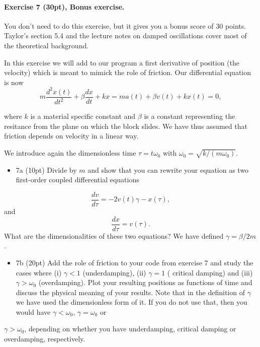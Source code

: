 \documentclass[%
oneside,                 %
final,                   %
10pt]{article}
\begin{document}
\paragraph{Exercise 7 (30pt), Bonus exercise.}
You don't need to do this exercise, but it gives you a bonus score of 30 points. Taylor's section 5.4 and the lecture notes on damped oscillations cover most of the theoretical background.

In this exercise we will add to our program a first derivative of position (the velocity) which is meant to mimick the role of friction.
Our differential equation is now
\[
m\frac{d^2x(t)}{dt^2}+\beta\frac{dx}{dt}+kx=ma(t)+\beta v(t)+kx(t)=0,
\]

where $k$ is a material specific constant and $\beta$ is a constant
representing the resitance from the plane on which the block slides.
We have thus assumed that friction depends on velocity in a linear
way.

We introduce again the dimensionless time $\tau = t\omega_0$ with
$\omega_0=\sqrt{k/(m\omega_0)}$.

\begin{itemize}
\item 7a (10pt) Divide by $m$ and show that you can rewrite your equation as two first-order coupled differential equations
\end{itemize}

\noindent
\[
\frac{dv}{d\tau} = -2v(t)\gamma-x(\tau),
\]
and
\[
\frac{dx}{d\tau} = v(\tau).
\]
What are the dimensionalities of these two equations? We have defined $\gamma = \beta/2m$.  


\begin{itemize}
\item 7b (20pt)  Add the role of friction to your code from exercise 7 and study the cases where (i) $\gamma < 1$ (underdamping), (ii) $\gamma = 1$ ( critical damping) and (iii) $\gamma > \omega_0$ (overdamping). Plot your resulting positions as functions of time and discuss the physical meaning of your results. Note that in the definition of $\gamma$ we have used the dimensionless form of it. If you do not use that, then you would have $\gamma < \omega_0$, $\gamma =\omega_0$ or
\end{itemize}

\noindent
$\gamma > \omega_0$, depending on whether you have underdamping, critical damping or overdamping, respectively.


\end{document}
